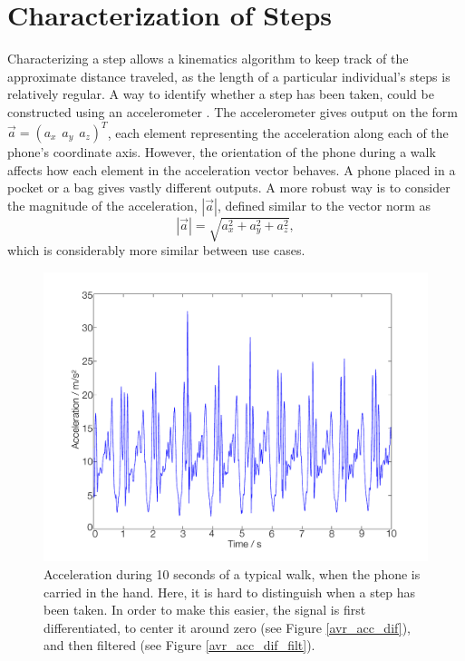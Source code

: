 \documentclass{LTHthesis}
\begin{document}
\section{Characterization of Steps}
\label{sec:step}
%
Characterizing a step allows a kinematics algorithm to keep track of the approximate distance traveled, as the length of a particular individual's steps is relatively regular. A way to identify whether a step has been taken, could be constructed using an accelerometer \cite{step_count}. The accelerometer gives output on the form $\vec a = (a_x \hspace{5pt} a_y \hspace{5pt} a_z)^T$, each element representing the acceleration along each of the phone's coordinate axis. However, the orientation of the phone during a walk affects how each element in the acceleration vector behaves. A phone placed in a pocket or a bag gives vastly different outputs. A more robust way is to consider the magnitude of the acceleration, $|\vec a|$, defined similar to the vector norm as 
%
\begin{equation}
|\vec a| = \sqrt{a_x^2+a_y^2+a_z^2},
\end{equation}
%
which is considerably more similar between use cases.
%
\begin{figure}[!hbt]

\includegraphics[width=1\textwidth ]{images/kinematic/avr_acc}
\caption{Acceleration during 10 seconds of a typical walk, when the phone is carried in the hand. Here, it is hard to distinguish when a step has been taken. In order to make this easier, the signal is first differentiated, to center it around zero (see Figure \ref{avr_acc_dif}), and then filtered (see Figure \ref{avr_acc_dif_filt}).} \label{avr_acc}
\end{figure}
\end{document}
